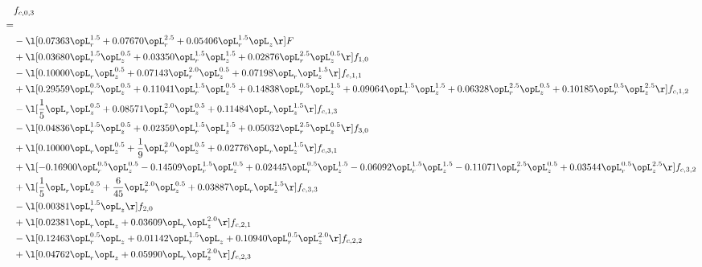 \begin{alignat}{2} 
\label{eq:f_03_2} 
& f_{c,0,3} \nonumber \\ 
 = \\ 
& - \l[  0.07363 \opL_r^{1.5} +  0.07670 \opL_r^{2.5} +  0.05406 \opL_r^{1.5} \opL_z  \r] F \nonumber \\ 
& + \l[  0.03680 \opL_r^{1.5} \opL_z^{0.5} +  0.03350 \opL_r^{1.5} \opL_z^{1.5} +  0.02876 \opL_r^{2.5} \opL_z^{0.5}  \r] f_{1,0} \nonumber \\ 
& - \l[  0.10000 \opL_r \opL_z^{0.5} +  0.07143 \opL_r^{2.0} \opL_z^{0.5} +  0.07198 \opL_r \opL_z^{1.5}  \r] f_{c,1,1} \nonumber \\ 
& + \l[  0.29559 \opL_r^{0.5} \opL_z^{0.5} +  0.11041 \opL_r^{1.5} \opL_z^{0.5} +  0.14838 \opL_r^{0.5} \opL_z^{1.5} +  0.09064 \opL_r^{1.5} \opL_z^{1.5} +  0.06328 \opL_r^{2.5} \opL_z^{0.5} +  0.10185 \opL_r^{0.5} \opL_z^{2.5}  \r] f_{c,1,2} \nonumber \\ 
& - \l[ \frac{1}{5} \opL_r \opL_z^{0.5} +  0.08571 \opL_r^{2.0} \opL_z^{0.5} +  0.11484 \opL_r \opL_z^{1.5}  \r] f_{c,1,3} \nonumber \\ 
& - \l[  0.04836 \opL_r^{1.5} \opL_z^{0.5} +  0.02359 \opL_r^{1.5} \opL_z^{1.5} +  0.05032 \opL_r^{2.5} \opL_z^{0.5}  \r] f_{3,0} \nonumber \\ 
& + \l[  0.10000 \opL_r \opL_z^{0.5} + \frac{1}{9} \opL_r^{2.0} \opL_z^{0.5} +  0.02776 \opL_r \opL_z^{1.5}  \r] f_{c,3,1} \nonumber \\ 
& + \l[  -0.16900 \opL_r^{0.5} \opL_z^{0.5}   -0.14509 \opL_r^{1.5} \opL_z^{0.5} +  0.02445 \opL_r^{0.5} \opL_z^{1.5}   -0.06092 \opL_r^{1.5} \opL_z^{1.5}   -0.11071 \opL_r^{2.5} \opL_z^{0.5} +  0.03544 \opL_r^{0.5} \opL_z^{2.5}  \r] f_{c,3,2} \nonumber \\ 
& + \l[ \frac{1}{5} \opL_r \opL_z^{0.5} + \frac{6}{45} \opL_r^{2.0} \opL_z^{0.5} +  0.03887 \opL_r \opL_z^{1.5}  \r] f_{c,3,3} \nonumber \\ 
& - \l[  0.00381 \opL_r^{1.5} \opL_z  \r] f_{2,0} \nonumber \\ 
& + \l[  0.02381 \opL_r \opL_z +  0.03609 \opL_r \opL_z^{2.0}  \r] f_{c,2,1} \nonumber \\ 
& - \l[  0.12463 \opL_r^{0.5} \opL_z +  0.01142 \opL_r^{1.5} \opL_z +  0.10940 \opL_r^{0.5} \opL_z^{2.0}  \r] f_{c,2,2} \nonumber \\ 
& + \l[  0.04762 \opL_r \opL_z +  0.05990 \opL_r \opL_z^{2.0}  \r] f_{c,2,3} \nonumber \\ 
\end{alignat} 


